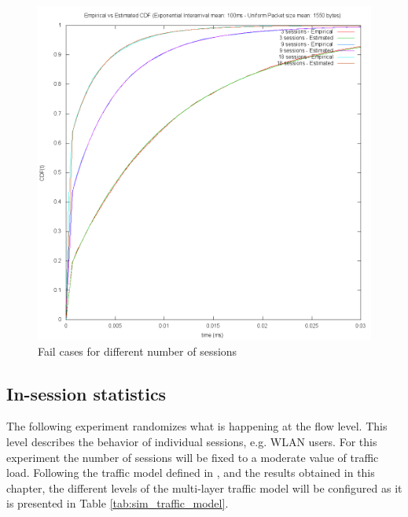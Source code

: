 
\begin{figure}[t]
	\centering
	\includegraphics[scale=0.28]{images/results/GlobalView/sessions/sessions_ks_fail}
	\caption{Fail cases for different number of sessions}
	\label{fig:sessions_ks_fail}
\end{figure}

\subsection{In-session statistics}
The following experiment randomizes what is happening at the flow level. This level describes the behavior of individual sessions, e.g. \acs{WLAN} users. For this experiment the number of sessions will be fixed to a moderate value of traffic load. Following the traffic model defined in \cite{Campus-WLAN}, and the results obtained in this chapter, the different levels of the multi-layer traffic model will be configured as it is presented in Table \ref{tab:sim_traffic_model}.


